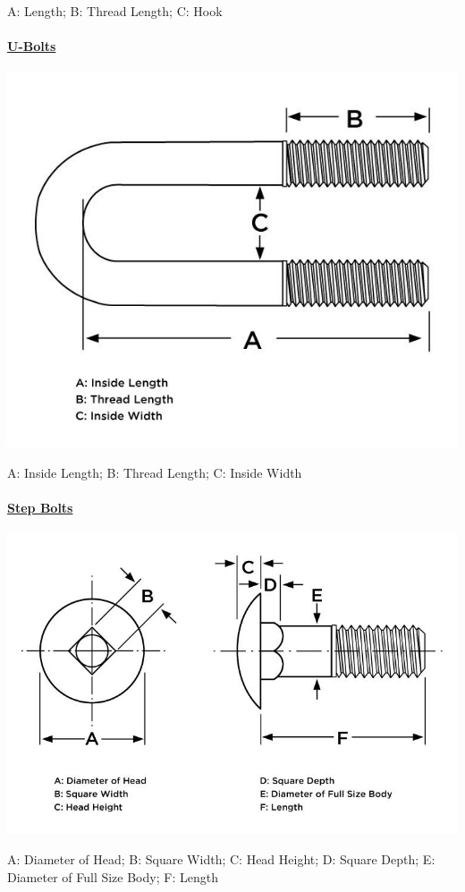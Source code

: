\documentclass[english,]{article}
\let\oldparagraph\paragraph
\renewcommand{\paragraph}[1]{\oldparagraph{#1}\mbox{}}
\begin{document}
\hypertarget{i9y9v8n}{}
A: Length; B: Thread Length; C: Hook

\hypertarget{iob5e0i}{}
\hypertarget{in9zoqf}{%
\paragraph{\texorpdfstring{\href{https://www.huyett.com/all-products/bolts/u-bolts}{U-Bolts}}{U-Bolts}}\label{in9zoqf}}

\includegraphics{Introduction to Nut and Bolt Sizes_files/6307bd701bf44407484420.jpg}

\hypertarget{iceu7t3}{}
A: Inside Length; B: Thread Length; C: Inside Width

\hypertarget{i6ize6}{}
\hypertarget{ilxlvm}{%
\paragraph{\texorpdfstring{\href{https://www.huyett.com/product/search?search=step\%20bolt}{Step
Bolts}}{Step Bolts}}\label{ilxlvm}}

\includegraphics{Introduction to Nut and Bolt Sizes_files/6307c769a225a243287054.jpg}

\hypertarget{iba6cl}{}
A: Diameter of Head; B: Square Width; C: Head Height; D: Square Depth;
E: Diameter of Full Size Body; F: Length

\hypertarget{irkmnp}{}
\end{document}
